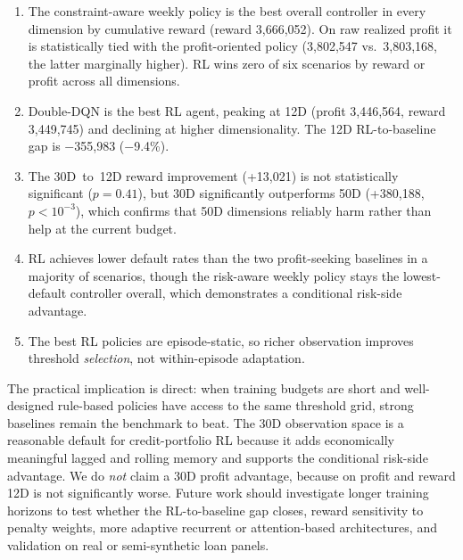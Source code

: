 \documentclass[preprint,review,authoryear,12pt]{elsarticle}
\begin{document}
\begin{enumerate}[leftmargin=*,label=(\arabic*)]
    \item The constraint-aware weekly policy is the best overall controller in every
          dimension by cumulative reward (reward 3{,}666{,}052). On raw realized profit it
          is statistically tied with the profit-oriented policy (3{,}802{,}547 vs.\
          3{,}803{,}168, the latter marginally higher). RL wins zero of six scenarios by
          reward or profit across all dimensions.
    \item Double-DQN is the best RL agent, peaking at 12D (profit 3{,}446{,}564, reward
              3{,}449{,}745) and declining at higher dimensionality. The 12D RL-to-baseline gap
          is $-$355{,}983 ($-$9.4\%).
    \item The 30D~to~12D reward improvement (+13{,}021) is not statistically significant
          ($p = 0.41$), but 30D significantly outperforms 50D (+380{,}188, $p<10^{-3}$),
          which confirms that 50D dimensions reliably harm rather than help at the current
          budget.
    \item RL achieves lower default rates than the two profit-seeking baselines in a
          majority of scenarios, though the risk-aware weekly policy stays the
          lowest-default controller overall, which demonstrates a conditional risk-side
          advantage.
    \item The best RL policies are episode-static, so richer observation improves threshold
          \emph{selection}, not within-episode adaptation.
\end{enumerate}

\noindent
The practical implication is direct: when training budgets are short and well-designed
rule-based policies have access to the same threshold grid, strong baselines remain the
benchmark to beat. The 30D observation space is a reasonable default for credit-portfolio
RL because it adds economically meaningful lagged and rolling memory and supports the
conditional risk-side advantage. We do \emph{not} claim a 30D profit advantage, because
on profit and reward 12D is not significantly worse. Future work should investigate
longer training horizons to test whether the RL-to-baseline gap closes, reward
sensitivity to penalty weights, more adaptive recurrent or attention-based architectures,
and validation on real or semi-synthetic loan panels.
\end{document}
